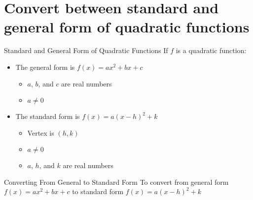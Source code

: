 \documentclass[t,usenames,dvipsnames]{beamer}
\begin{document}
\section{Convert between standard and general form of quadratic functions}

\begin{frame}{Standard and General Form of Quadratic Functions}
If $f$ is a quadratic function: \newline\\  
\begin{itemize}
    \item<+-> The \alert{general form} is $f(x) = ax^2+bx+c$
    \begin{itemize}
        \item<+-> $a$, $b$, and $c$ are real numbers
        \item<+-> $a \neq 0$    
    \end{itemize}   \vspace{8pt}
    \item<+-> The \alert{standard form} is $f(x) = a(x-h)^2 + k$
    \begin{itemize}
        \item<+-> Vertex is $(h,k)$
        \item<+-> $a \neq 0$
        \item<+-> $a$, $h$, and $k$ are real numbers
    \end{itemize}
\end{itemize}
\end{frame}

\begin{frame}{Converting From General to Standard Form}
    To convert from general form $f(x) = ax^2 + bx + c$ to standard form $f(x) = a(x-h)^2+k$ \newline\\
    \begin{enumerate}
          \\[8pt]
        \begin{itemize}
             \\[8pt]
             \\[8pt]
             \\[8pt]
        \end{itemize}
    \end{enumerate}
\end{frame}
\end{document}
